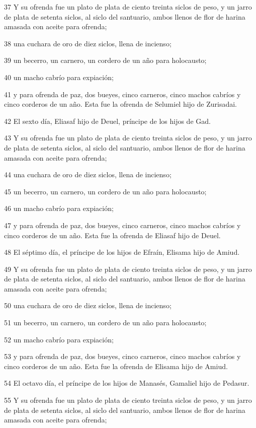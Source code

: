 \par 37 Y su ofrenda fue un plato de plata de ciento treinta siclos de peso,  y un jarro de plata de setenta siclos, al siclo del santuario, ambos llenos de flor de harina amasada con aceite para ofrenda;
\par 38 una cuchara de oro de diez siclos,  llena de incienso;
\par 39 un becerro, un carnero, un cordero de un año para holocausto;
\par 40 un macho cabrío para expiación;
\par 41 y para ofrenda de paz, dos bueyes, cinco carneros, cinco machos cabríos y cinco corderos de un año. Esta fue la ofrenda de Selumiel hijo de Zurisadai.
\par 42 El sexto día, Eliasaf hijo de Deuel, príncipe de los hijos de Gad.
\par 43 Y su ofrenda fue un plato de plata de ciento treinta siclos de peso,  y un jarro de plata de setenta siclos, al siclo del santuario, ambos llenos de flor de harina amasada con aceite para ofrenda;
\par 44 una cuchara de oro de diez siclos,  llena de incienso;
\par 45 un becerro, un carnero, un cordero de un año para holocausto;
\par 46 un macho cabrío para expiación;
\par 47 y para ofrenda de paz, dos bueyes, cinco carneros, cinco machos cabríos y cinco corderos de un año. Esta fue la ofrenda de Eliasaf hijo de Deuel.
\par 48 El séptimo día, el príncipe de los hijos de Efraín, Elisama hijo de Amiud.
\par 49 Y su ofrenda fue un plato de plata de ciento treinta siclos de peso,  y un jarro de plata de setenta siclos, al siclo del santuario, ambos llenos de flor de harina amasada con aceite para ofrenda;
\par 50 una cuchara de oro de diez siclos,  llena de incienso;
\par 51 un becerro, un carnero, un cordero de un año para holocausto;
\par 52 un macho cabrío para expiación;
\par 53 y para ofrenda de paz, dos bueyes, cinco carneros, cinco machos cabríos y cinco corderos de un año. Esta fue la ofrenda de Elisama hijo de Amiud.
\par 54 El octavo día, el príncipe de los hijos de Manasés, Gamaliel hijo de Pedasur.
\par 55 Y su ofrenda fue un plato de plata de ciento treinta siclos   de peso, y un jarro de plata de setenta siclos, al siclo del santuario, ambos llenos de flor de harina amasada con aceite para ofrenda;
